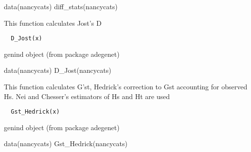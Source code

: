 \documentclass[letterpaper]{book}
\begin{document}
%
\begin{Examples}
\begin{ExampleCode}
data(nancycats)
diff_stats(nancycats)
\end{ExampleCode}
\end{Examples}
%
\begin{Description}\relax
This function calculates Jost's D
\end{Description}
%
\begin{Usage}
\begin{verbatim}
  D_Jost(x)
\end{verbatim}
\end{Usage}
%
\begin{Arguments}
\begin{ldescription}
\item[\code{x}] genind object (from package adegenet)
\end{ldescription}
\end{Arguments}
%
\begin{Examples}
\begin{ExampleCode}
data(nancycats)
D_Jost(nancycats)
\end{ExampleCode}
\end{Examples}
%
\begin{Description}\relax
This function calculates G'st, Hedrick's correction to
Gst accounting for observed Hs. Nei and Chesser's
estimators of Hs and Ht are used
\end{Description}
%
\begin{Usage}
\begin{verbatim}
  Gst_Hedrick(x)
\end{verbatim}
\end{Usage}
%
\begin{Arguments}
\begin{ldescription}
\item[\code{x}] genind object (from package adegenet)
\end{ldescription}
\end{Arguments}
%
\begin{Examples}
\begin{ExampleCode}
data(nancycats)
Gst_Hedrick(nancycats)
\end{ExampleCode}
\end{Examples}
\end{document}
